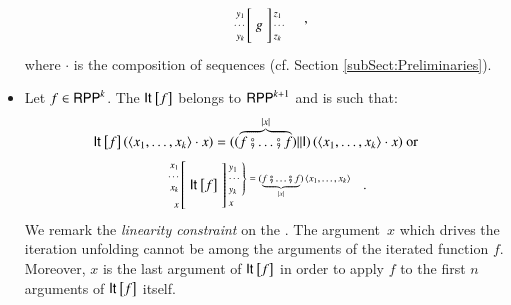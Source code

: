 \begin{definition}
\begin{itemize}
\begin{align*}
\begin{array}{c}
 \\
 \vspace{.25em}
 \arraycolsep=1.4pt
 \begin{array}{rcl}
  \left. {\scriptsize \begin{array}{r} 
                          y_1\\ \cdots\\ y_k
                        \end{array}
          } \right[
  & g &
  \left] {\scriptsize \begin{array}{l}
                        z_1\\ \cdots\\ z_k
                      \end{array} } \right.
 \end{array}
\end{array}
\enspace ,
\end{align*}
where $\cdot$ is the composition of sequences (cf. Section \ref{subSect:Preliminaries}).
\item 
Let $ f\in\mathsf{RPP}^{k}$. 
The \rprItName $ {\mathsf{It}^{}_{}\left[ f \right]} $ belongs to $\mathsf{RPP}^{k+1}$ and is such that:
\begin{align*}
{\mathsf{It}^{}_{}\left[ f \right]}\, (\langle x_1,\ldots, x_k \rangle \cdot x) & =  
   ((\overbrace{f\fatsemi \ldots\fatsemi f}^{|x|}) \rVert \mathsf{I})\,
             (  \langle x_1,\ldots, x_k \rangle \cdot x)
\textrm{ or }
\end{align*}
\begin{align*}
\arraycolsep=1.4pt
\begin{array}{rcl}
 \left. {\scriptsize 
           \begin{array}{r}
             x_1\\ \cdots\\ x_k\\[1.5mm]
             x
           \end{array} 
         } \right[
 & \rprIt{}{}{f} &
 \left] {\scriptsize 
          \begin{array}{l}
           \!\!
           \left .
           \begin{array}{l}
            y_1\\ \cdots\\ y_k
           \end{array} 
           \right \} = 
              (\underbrace{\rprSCom{f}{\rprSCom{\ldots}{f}}}_{|x|})
              \, \langle x_1, \ldots, x_k \ra\\
          x
          \end{array} 
        } \right.
\end{array}
\enspace .
\end{align*}
We remark the \emph{linearity constraint} on the \rprItName.
The argument~$x$ which drives the iteration unfolding cannot be among the arguments
of the iterated function $ f $.
Moreover, $ x $ is the last argument of $ {\mathsf{It}^{}_{}\left[ f \right]} $ in order to apply $ f $ to the first $ n $ arguments
of $ {\mathsf{It}^{}_{}\left[ f \right]} $ itself.


\end{itemize}
\end{definition}
